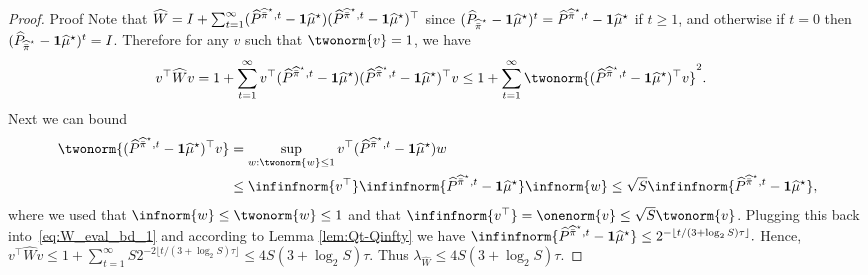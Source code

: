 \documentclass[mnsc,nonblindrev]{informs3}
\newcommand{\lwhat}{\lambda_{\widehat{W}}}
\newcommand{\one}{\mathbf{1}}
\newcommand{\pihbst}{\widehat{\Bar{\pi}}^\star}
\newcommand{\muhst}{\widehat{\mu}^\star}
\begin{document}
\begin{APPENDICES}
\begin{proof}{Proof}
Note that
$
    \widehat{W} = I + \sum_{t=1}^\infty (\widehat{P}^{\pihbst,t} - \one\muhst) (\widehat{P}^{\pihbst,t} - \one\muhst)^\top
$
    since $(\widehat{P}_{\pihbst} - \one\muhst)^t = \widehat{P}^{\pihbst,t} - \one\muhst$ if $t \geq 1$, and otherwise if $t = 0$ then $(\widehat{P}_{\pihbst} - \one\muhst)^t = I$.
Therefore for any $v$ such that $\twonorm{v} = 1$, we have
\begin{align}
    v^\top \widehat{W} v &= 1 + \sum_{t=1}^\infty v^\top(\widehat{P}^{\pihbst,t} - \one\muhst) (\widehat{P}^{\pihbst,t} - \one\muhst)^\top v 
    \leq 1 + \sum_{t=1}^\infty \twonorm{(\widehat{P}^{\pihbst,t} - \one\muhst)^\top v}^2. \label{eq:W_eval_bd_1}
\end{align}
Next we can bound
\begin{align*}
    \twonorm{(\widehat{P}^{\pihbst,t} - \one\muhst)^\top v} &= \sup_{w:\twonorm{w}\leq 1} v^\top (\widehat{P}^{\pihbst,t} - \one\muhst) w \\
    & \leq \infinfnorm{v^\top} \infinfnorm{\widehat{P}^{\pihbst,t} - \one\muhst} \infnorm{w} 
     \leq \sqrt{S} \infinfnorm{\widehat{P}^{\pihbst,t} - \one\muhst},
\end{align*}
where we used that $\infnorm{w} \leq \twonorm{w}\leq 1$ and that $\infinfnorm{v^\top} = \onenorm{v} \leq \sqrt{S} \twonorm{v}$. Plugging this back into~\eqref{eq:W_eval_bd_1} and according to Lemma \ref{lem:Qt-Qinfty} we have 
$
    \infinfnorm{\widehat{P}^{\pihbst,t} - \one\muhst} \leq 2^{-\lfloor t/(3+\log_2S)\tau\rfloor}.
$
Hence,
$
    v^\top \widehat{W} v 
    \leq 1 + \sum_{t=1}^\infty S 2^{-2\lfloor t/(3+\log_2S)\tau\rfloor} \le 4S(3+\log_2S)\tau.
$
Thus \(\lwhat \leq 4S(3+\log_2S)\tau\).
\end{proof}


\end{APPENDICES}
\end{document}
